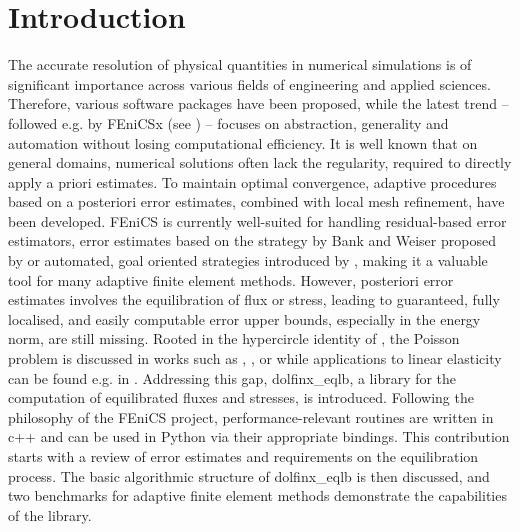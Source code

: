
\section*{Introduction}
The accurate resolution of physical quantities in numerical simulations is of significant importance across various fields of engineering and applied sciences. 
Therefore, various software packages have been proposed, while the latest trend -- followed e.g. by FEniCSx (see \cite{FEniCSx_2023}) -- focuses on abstraction, generality and automation without losing computational efficiency. 
It is well known that on general domains, numerical solutions often lack the regularity, required to directly apply a priori estimates. 
To maintain optimal convergence, adaptive procedures based on a posteriori error estimates, combined with local mesh refinement, have been developed. 
FEniCS is currently well-suited for handling residual-based error estimators, error estimates based on the strategy by Bank and Weiser proposed by \cite{Bulle_BankWeiserApeFenics_2021} or automated, goal oriented strategies introduced by \cite{Rognes_AutomatedEE_2013}, making it a valuable tool for many adaptive finite element methods. 
However, posteriori error estimates involves the equilibration of flux or stress, leading to guaranteed, fully localised, and easily computable error upper bounds, especially in the energy norm, are still missing.
Rooted in the hypercircle identity of \cite{Prager_Equilibartion_1947}, the Poisson problem is discussed in works such as \cite{Braess_EqlbFluxes_2008}, \cite{Cai_SemiexplzEqlb_2012}, \cite{Ern_FluxEqlb_2015} or \cite{Bertrand_Hypercircle_2020} while applications to linear elasticity can be found e.g. in \cite{Bertrand_EqlbElast_2021}.
Addressing this gap, dolfinx\_eqlb, a library for the computation of equilibrated fluxes and stresses, is introduced.
Following the philosophy of the FEniCS project, performance-relevant routines are written in c++ and can be used in Python via their appropriate bindings. 
This contribution starts with a review of error estimates and requirements on the equilibration process. 
The basic algorithmic structure of dolfinx\_eqlb is then discussed, and two benchmarks for adaptive finite element methods demonstrate the capabilities of the library.
\vspace{-0.5cm}

